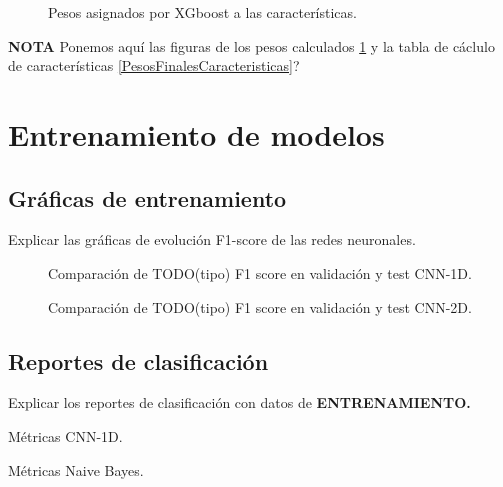   \begin{figure}[H]
      \centering
      
      \caption{Pesos asignados por XGboost a las características.}
      \label{FeatureWeightsImage}
   \end{figure}

  \textbf{NOTA} Ponemos aquí las figuras de los pesos calculados \ref{FeatureWeightsImage} y la tabla de cáclulo de características \ref{PesosFinalesCaracteristicas}?

\section{Entrenamiento de modelos}

  
  \subsection{Gráficas de entrenamiento}

    Explicar las gráficas de evolución F1-score de las redes neuronales.


    \begin{figure}[h]
        \centering
        
        \caption{Comparación de TODO(tipo) F1 score en validación y test CNN-1D.}
        \label{F1Score1DImage}
     \end{figure}


    \begin{figure}[h]
        \centering
        
        \caption{Comparación de TODO(tipo) F1 score en validación y test CNN-2D.}
        \label{F1Score2DImage}
     \end{figure}


  \subsection{Reportes de clasificación}
       
    Explicar los reportes de clasificación con datos de \textbf{ENTRENAMIENTO.}

      \begin{table}[H]
        \centering
        \caption{Métricas CNN-1D.}
        \label{CNN1DMetrics}
      \end{table}

      \begin{table}[H]
        \centering
        \caption{Métricas Naive Bayes.}
        \label{NBMetrics}
      \end{table}

